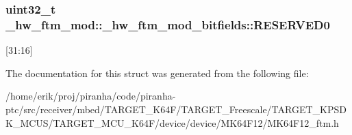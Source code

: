 \subsubsection[{\texorpdfstring{R\+E\+S\+E\+R\+V\+E\+D0}{RESERVED0}}]{\setlength{\rightskip}{0pt plus 5cm}uint32\+\_\+t \+\_\+hw\+\_\+ftm\+\_\+mod\+::\+\_\+hw\+\_\+ftm\+\_\+mod\+\_\+bitfields\+::\+R\+E\+S\+E\+R\+V\+E\+D0}\hypertarget{struct__hw__ftm__mod_1_1__hw__ftm__mod__bitfields_a42c2f4f5bdf494600670d220eac78452}{}\label{struct__hw__ftm__mod_1_1__hw__ftm__mod__bitfields_a42c2f4f5bdf494600670d220eac78452}
\mbox{[}31\+:16\mbox{]} 

The documentation for this struct was generated from the following file\+:\begin{DoxyCompactItemize}
\item 
/home/erik/proj/piranha/code/piranha-\/ptc/src/receiver/mbed/\+T\+A\+R\+G\+E\+T\+\_\+\+K64\+F/\+T\+A\+R\+G\+E\+T\+\_\+\+Freescale/\+T\+A\+R\+G\+E\+T\+\_\+\+K\+P\+S\+D\+K\+\_\+\+M\+C\+U\+S/\+T\+A\+R\+G\+E\+T\+\_\+\+M\+C\+U\+\_\+\+K64\+F/device/device/\+M\+K64\+F12/M\+K64\+F12\+\_\+ftm.\+h\end{DoxyCompactItemize}
